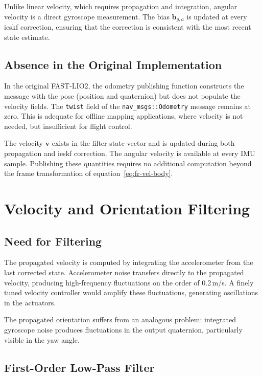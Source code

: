 Unlike linear velocity, which requires propagation and integration, angular
velocity is a direct gyroscope measurement. The bias $\mathbf{b}_{g,a}$ is updated
at every \gls{ieskf} correction, ensuring that the correction is consistent with the
most recent state estimate.

\subsection{Absence in the Original Implementation}
\label{sec:fr-vel-absence}

In the original FAST-LIO2, the odometry publishing function constructs the message
with the pose (position and quaternion) but does not populate the velocity fields.
The \texttt{twist} field of the \texttt{nav\_msgs::Odometry} message remains at
zero. This is adequate for offline mapping applications, where velocity is not
needed, but insufficient for flight control.

The velocity $\mathbf{v}$ exists in the filter state vector and is updated during
both propagation and \gls{ieskf} correction. The angular velocity is available at
every IMU sample. Publishing these quantities requires no additional computation
beyond the frame transformation of equation~\eqref{eq:fr-vel-body}.

\section{Velocity and Orientation Filtering}
\label{sec:fr-filtering}

\subsection{Need for Filtering}
\label{sec:fr-filter-need}

The propagated velocity is computed by integrating the accelerometer from the last
corrected state. Accelerometer noise transfers directly to the propagated velocity,
producing high-frequency fluctuations on the order of 0.2\,m/s. A finely tuned
velocity controller would amplify these fluctuations, generating oscillations in the
actuators.

The propagated orientation suffers from an analogous problem: integrated gyroscope
noise produces fluctuations in the output quaternion, particularly visible in the
yaw angle.

\subsection{First-Order Low-Pass Filter}
\label{sec:fr-ema}

